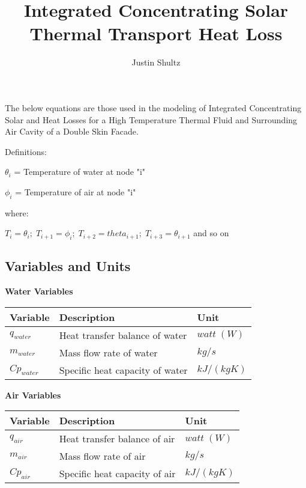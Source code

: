 \documentclass[12pt]{report}
\author{Justin Shultz}
\title{Integrated Concentrating Solar Thermal Transport Heat Loss}
\begin{document}
The below equations are those used in the modeling of Integrated Concentrating Solar and Heat Losses for a High Temperature Thermal Fluid and Surrounding Air Cavity of a Double Skin Facade.

Definitions: 

$\theta_i$ = Temperature of water at node "i"

$\phi_i$ = Temperature of air at node "i"

where:

$ T_i = \theta_i; \; T_{i+1} = \phi_i; \; T_{i+2} = theta_{i+1}; \; T_{i+3} = \theta_{i+1}$ and so on 

\subsection{Variables and Units}

\begin{center}
	\textbf{Water Variables} \\
	\begin{tabular}{| l | l | l |}
		\hline
		Variable & Description & Unit  \\ \hline
		$q_{water}$ & Heat transfer balance of water & $watt \; (W)$ \\ \hline
		$m_{water}$ & Mass flow rate of water & $kg/s$ \\ \hline
		$Cp_{water}$ & Specific heat capacity of water & $kJ/(kg K)$  \\ \hline
		
	\end{tabular}
\end{center}


\begin{center}
	\textbf{Air Variables} \\
	\begin{tabular}{| l | l | l |}
		\hline
		Variable & Description & Unit  \\ \hline
		$q_{air}$ & Heat transfer balance of air & $watt \; (W)$ \\ \hline
		$m_{air}$ & Mass flow rate of air & $kg/s$ \\ \hline
		$Cp_{air}$ & Specific heat capacity of air & $kJ/(kg K)$  \\ \hline
	\end{tabular}
\end{center}
\end{document}

